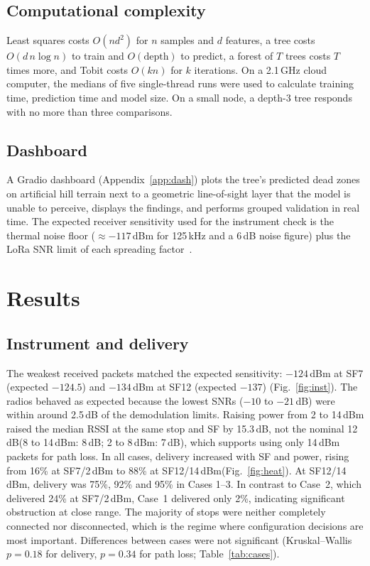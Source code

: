 \documentclass[conference]{IEEEtran}
\newcommand{\dBm}{\,dBm\xspace}
\newcommand{\dB}{\,dB\xspace}
\begin{document}
\subsection{Computational complexity}
Least squares costs $O(nd^2)$ for $n$ samples and $d$ features, a tree costs $O(d\,n\log n)$ to train and $O(\text{depth})$ to predict, a forest of $T$ trees costs $T$ times more, and Tobit costs $O(kn)$ for $k$ iterations. On a 2.1\,GHz cloud computer, the medians of five single-thread runs were used to calculate training time, prediction time and model size. On a small node, a depth-3 tree responds with no more than three comparisons.

\subsection{Dashboard}
A Gradio dashboard (Appendix~\ref{app:dash}) plots the tree's predicted dead zones on artificial hill terrain next to a geometric line-of-sight layer that the model is unable to perceive, displays the findings, and performs grouped validation in real time. The expected receiver sensitivity used for the instrument check is the thermal noise floor ($\approx -117$\dBm for 125\,kHz and a 6\dB noise figure) plus the LoRa SNR limit of each spreading factor~\cite{semtech_an1200}.

\section{Results}\label{sec:results}

\subsection{Instrument and delivery}
The weakest received packets matched the expected sensitivity: $-124$\dBm at SF7 (expected $-124.5$) and $-134$\dBm at SF12 (expected $-137$) (Fig.~\ref{fig:inst}). The radios behaved as expected because the lowest SNRs ($-10$ to $-21$\dB) were within around 2.5\dB of the demodulation limits. Raising power from 2 to 14\dBm raised the median RSSI at the same stop and SF by 15.3\dB, not the nominal 12\dB (8 to 14\dBm: 8\dB; 2 to 8\dBm: 7\dB), which supports using only 14\dBm packets for path loss. In all cases, delivery increased with SF and power, rising from 16\% at SF7/2\dBm to 88\% at SF12/14\dBm (Fig.~\ref{fig:heat}). At SF12/14\dBm, delivery was 75\%, 92\% and 95\% in Cases 1--3. In contrast to Case~2, which delivered 24\% at SF7/2\dBm, Case~1 delivered only 2\%, indicating significant obstruction at close range. The majority of stops were neither completely connected nor disconnected, which is the regime where configuration decisions are most important. Differences between cases were not significant (Kruskal--Wallis $p = 0.18$ for delivery, $p = 0.34$ for path loss; Table~\ref{tab:cases}).
\end{document}
